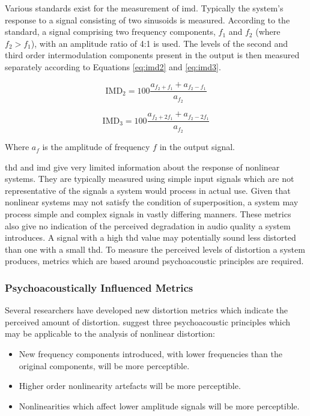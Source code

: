 			Various standards exist for the measurement of \acrshort{imd}. Typically the system's response to a
			signal consisting of two sinusoids is measured. According to the \citet{IEC2001amplifiers}
			standard, a signal comprising two frequency components, $f_{1}$ and $f_{2}$ (where $f_{2} >
			f_{1}$), with an amplitude ratio of 4:1 is used.  The levels of the second and third order
			intermodulation components present in the output is then measured separately according to Equations
			\ref{eq:imd2} and \ref{eq:imd3}.

			\begin{equation}
				\mathrm{IMD}_{2} = 100\frac{a_{f_{2} + f_{1}} + a_{f_{2} - f_{1}}}{a_{f_{2}}}
				\label{eq:imd2}
			\end{equation}

			\begin{equation}
				\mathrm{IMD}_{3} = 100\frac{a_{f_{2} + 2f_{1}} + a_{f_{2} - 2f_{1}}}{a_{f_{2}}}
				\label{eq:imd3}
			\end{equation}

			Where $a_{f}$ is the amplitude of frequency $f$ in the output signal.

			\acrshort{thd} and \acrshort{imd} give very limited information about the response of nonlinear
			systems. They are typically measured using simple input signals which are not representative of the
			signals a system would process in actual use. Given that nonlinear systems may not satisfy the
			condition of superposition, a system may process simple and complex signals in vastly differing
			manners. These metrics also give no indication of the perceived degradation in audio quality a
			system introduces.  A signal with a high \acrshort{thd} value may potentially sound less distorted
			than one with a small \acrshort{thd}. To measure the perceived levels of distortion a system
			produces, metrics which are based around psychoacoustic principles are required.

		\subsubsection*{Psychoacoustically Influenced Metrics}
			Several researchers have developed new distortion metrics which indicate the perceived amount of
			distortion. \citet{geddes2003auditory} suggest three psychoacoustic principles which may be
			applicable to the analysis of nonlinear distortion:

			\begin{itemize}
				\item New frequency components introduced, with lower frequencies than the original
					components, will be more perceptible.
				\item Higher order nonlinearity artefacts will be more perceptible.
				\item Nonlinearities which affect lower amplitude signals will be more perceptible.
			\end{itemize}

